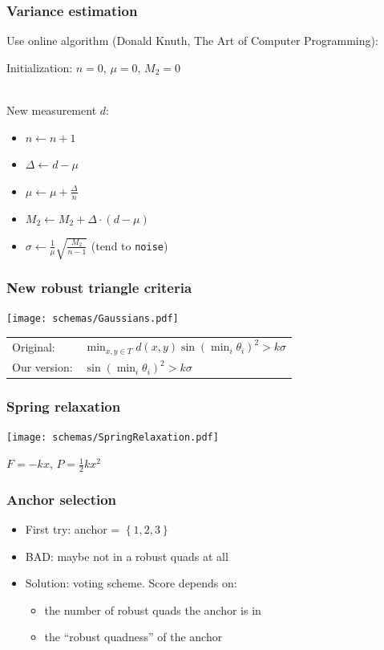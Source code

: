 \documentclass{beamer}
\begin{document}
\begin{frame}
    \frametitle{Variance estimation}
    
    Use online algorithm (Donald Knuth, The Art of Computer Programming):
    
    Initialization: $n = 0$, $\mu = 0$, $M_2 = 0$ \\~
    
    New measurement $d$:
    \begin{itemize}
        \item $n \gets n+1$
        \item $\Delta \gets d - \mu$
        \item $\mu \gets \mu + \frac{\Delta}{n}$
        \item $M_2 \gets M_2 + \Delta \cdot (d-\mu)$
        \item $\sigma \gets \frac{1}{\mu}\sqrt{\frac{M_2}{n - 1}}$ (tend to \texttt{noise})
    \end{itemize}
\end{frame}

\begin{frame}
    \frametitle{New robust triangle criteria}
    \texttt{[image: schemas/Gaussians.pdf]}
    
    \begin{tabular}{ll}
        Original: &  $\min_{x,y \in T} d(x,y) \sin(\min_i \theta_i)^2 > k \sigma$ \\
        Our version: & $\sin(\min_i \theta_i)^2 > k \sigma$ \\
    \end{tabular}
\end{frame}

\begin{frame}
    \frametitle{Spring relaxation}
    \begin{center}
    \texttt{[image: schemas/SpringRelaxation.pdf]}
    \end{center}
    
    $F=-kx$, $P = \frac{1}{2} k x^2$
\end{frame}

\begin{frame}
    \frametitle{Anchor selection}
    
    \begin{itemize}
        \item First try: anchor = $\left\{ 1,2,3 \right\}$
        \item BAD: maybe not in a robust quads at all
        \item Solution: voting scheme. Score depends on:
    
        \begin{itemize}
            \item the number of robust quads the anchor is in
            \item the ``robust quadness'' of the anchor
        \end{itemize}
    \end{itemize}
\end{frame}
\end{document}
